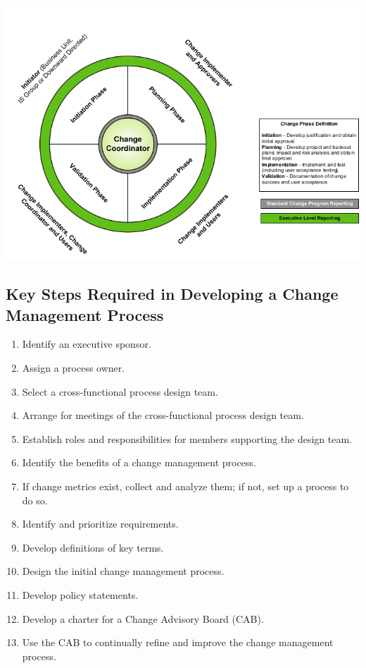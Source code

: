 \documentclass[8pt]{extarticle}
\begin{document}
\begin{multicols}{3}
\begin{center}
    \begin{minipage}{\columnwidth}
        \includegraphics[width=\columnwidth]{change-coordinator.png}
    \end{minipage}
\end{center}

\subsection{Key Steps Required in Developing a Change Management Process}
\begin{enumerate}
\item Identify an executive sponsor.
\item Assign a process owner.
\item Select a cross-functional process design team.
\item Arrange for meetings of the cross-functional process design team.
\item Establish roles and responsibilities for members supporting the design team.
\item Identify the benefits of a change management process.
\item If change metrics exist, collect and analyze them; if not, set up a process to do so.
\item Identify and prioritize requirements.
\item Develop definitions of key terms.
\item Design the initial change management process.
\item Develop policy statements.
\item Develop a charter for a Change Advisory Board (CAB).
\item Use the CAB to continually refine and improve the change management process.
\end{enumerate}


\end{multicols}
\end{document}
